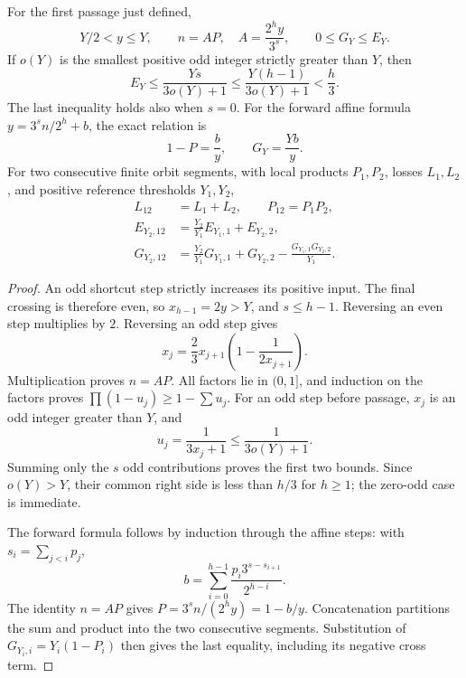 \begin{proposition}
\label{prop:Shaik-defect}
For the first passage just defined,
\begin{equation}\label{eq:Shaik-reverse-exact}
 Y/2<y\le Y,\qquad
 n=A P,\quad A=\frac{2^h y}{3^s},\qquad
 0\le G_Y\le E_Y.
\end{equation}
If \(o(Y)\) is the smallest positive odd integer strictly greater than
\(Y\), then
\begin{equation}\label{eq:Shaik-local-loss}
 E_Y\le\frac{Ys}{3o(Y)+1}
 \le\frac{Y(h-1)}{3o(Y)+1}<\frac h3.
\end{equation}
The last inequality holds also when \(s=0\).
For the forward affine formula \(y=3^s n/2^h+b\), the exact relation is
\begin{equation}\label{eq:Shaik-affine-defect}
 1-P=\frac by,\qquad G_Y=\frac{Yb}{y}.
\end{equation}
For two consecutive finite orbit segments, with local products \(P_1,P_2\),
losses \(L_1,L_2\), and positive reference thresholds \(Y_1,Y_2\),
\begin{align}
 L_{12}&=L_1+L_2,\qquad P_{12}=P_1P_2,\label{eq:Shaik-concat}\\
 E_{Y_2,12}&=\frac{Y_2}{Y_1}E_{Y_1,1}+E_{Y_2,2},\nonumber\\
 G_{Y_2,12}&=\frac{Y_2}{Y_1}G_{Y_1,1}+G_{Y_2,2}
                  -\frac{G_{Y_1,1}G_{Y_2,2}}{Y_1}.\nonumber
\end{align}
\end{proposition}
\begin{proof}
An odd shortcut step strictly increases its positive input. The final
crossing is therefore even, so \(x_{h-1}=2y>Y\), and \(s\le h-1\).
Reversing an even step multiplies by \(2\). Reversing an odd step gives
\[
 x_j=\frac23 x_{j+1}\left(1-\frac1{2x_{j+1}}\right).
\]
Multiplication proves \(n=AP\). All factors lie in \((0,1]\), and induction
on the factors proves \(\prod(1-u_j)\ge1-\sum u_j\).
For an odd step before passage, \(x_j\) is an odd integer greater than
\(Y\), and
\[
 u_j=\frac1{3x_j+1}\le\frac1{3o(Y)+1}.
\]
Summing only the \(s\) odd contributions proves the first two bounds.
Since \(o(Y)>Y\), their common right side is less than \(h/3\) for
\(h\ge1\); the zero-odd case is immediate.

The forward formula follows by induction through the affine steps:
with \(s_i=\sum_{j<i}p_j\),
\[
 b=\sum_{i=0}^{h-1}\frac{p_i3^{s-s_{i+1}}}{2^{h-i}}.
\]
The identity \(n=AP\) gives \(P=3^sn/(2^hy)=1-b/y\).
Concatenation partitions the sum and product into the two consecutive
segments. Substitution of \(G_{Y_i,i}=Y_i(1-P_i)\) then gives the
last equality, including its negative cross term.
\end{proof}

